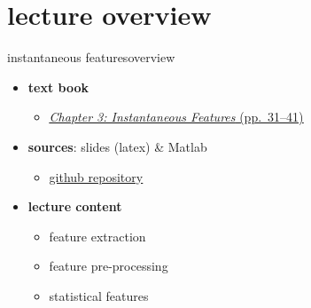 

\subtitle{Part 4.1: Instantaneous Features~---~Introduction}


	

    \section[overview]{lecture overview}
        \begin{frame}{instantaneous features}{overview}
            \begin{itemize}
                \item   \textbf{text book}  
                    \begin{itemize}
                        \item   \href{http://ieeexplore.ieee.org/xpl/articleDetails.jsp?tp=&arnumber=6331120&}{\underline{\textit{Chapter 3: Instantaneous Features} (pp.~31--41)}}
                    \end{itemize}
                \item   \textbf{sources}: slides (latex) \& Matlab  
                    \begin{itemize}
                        \item   \href{https://github.com/alexanderlerch/ACA-Slides}{\underline{github repository}}
                    \end{itemize}
                \bigskip
                \item<2->   \textbf{lecture content}
                    \begin{itemize}
                        \item<2->   feature extraction 
                        \item<3->   feature pre-processing
                        \item<4->   statistical features
                    \end{itemize}
            \end{itemize}
        \end{frame}

